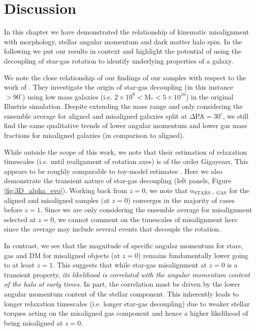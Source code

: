 \section{Discussion} \label{sec:tng_discussion}
In this chapter we have demonstrated the relationship of kinematic misalignment with morphology, stellar angular momentum and dark matter halo spin. In the following we put our results in context and highlight the potential of using the decoupling of star-gas rotation to identify underlying properties of a galaxy. 

We note the close relationship of our findings of our samples with respect to the work of \citet{starkenburg+19}. They investigate the origin of star-gas decoupling (in this instance $ > 90^{\circ}$) using low mass galaxies (i.e. $2 \times \mathrm{10^{9} < M_{\ast} < 5 \times 10^{10}}$) in the original Illustris simulation. Despite extending the mass range and only considering the ensemble average for aligned and misaligned galaxies split at $\Delta$PA$ = 30^{\circ}$, we still find the same qualitative trends of lower angular momentum and lower gas mass fractions for misaligned galaxies (in comparison to aligned). 

While outside the scope of this work, we note that their estimation of relaxation timescales (i.e. until realignment of rotation axes) is of the order Gigayears. This appears to be roughly comparable to toy-model estimates \citep[see;][albeit for ETGs]{davis2016}. Here we also demonstrate the transient nature of star-gas decoupling (left panels, Figure \ref{fig:3D_alpha_evo}). Working back from $z=0$, we note that $\mathrm{\alpha_{STARS - GAS}}$ for the aligned and misaligned samples (at $z=0$) converges in the majority of cases before $z=1$. Since we are only considering the ensemble average for misalignment selected at $z=0$, we cannot comment on the timescales of misalignment here since the average may include several events that decouple the rotation.

In contrast, we see that the magnitude of specific angular momentum for stars, gas and DM for misaligned objects (at $z=0$) remains fundamentally lower going to at least $z=1$. This suggests that while star-gas misalignment at $z=0$ is a transient property, \textit{its likelihood is correlated with the angular momentum content of the halo at early times}. In part, the correlation must be driven by the lower angular momentum content of the stellar component. This inherently leads to longer relaxation timescales (i.e. longer star-gas decoupling) due to weaker stellar torques acting on the misaligned gas component and hence a higher likelihood of being misaligned at $z=0$.

